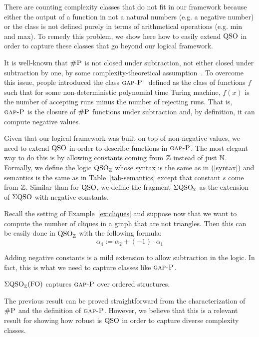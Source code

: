 There are counting complexity classes that do not fit in our framework because either the output of a function in not a natural numbers (e.g. a negative number) or the class is not defined purely in terms of arithmetical operations (e.g. min and max).
To remedy this problem, we show here how to easily extend ${\rm QSO}$ in order to capture these classes that go beyond our logical framework. 

It is well-known that $\text{\sc \#P}$ is not closed under subtraction, not either closed under subtraction by one, by some complexity-theoretical assumption~\cite{OH93}.
To overcome this issue, people introduced the class $\text{\sc gap-P}$~\cite{fenner1994gap} defined as the class of functions $f$ such that for some non-deterministic polynomial time Turing machine, $f(x)$ is the number of accepting runs minus the number of rejecting runs.
That is, $\text{\sc gap-P}$ is the closure of $\text{\sc \#P}$ functions under subtraction and, by definition, it can compute negative values. 

Given that our logical framework was built on top of non-negative values, we need to extend ${\rm QSO}$ in order to describe functions in $\text{\sc gap-P}$. 
The most elegant way to do this is by allowing constants coming from $\mathbb{Z}$ instead of just $\mathbb{N}$. 
Formally, we define the logic ${\rm QSO}_{\mathbb{Z}}$ whose syntax is the same as in (\ref{syntax}) and semantics is the same as in Table~\ref{tab-semantics} except that constant $s$ come from $\mathbb{Z}$.  
Similar than for ${\rm QSO}$, we define the fragment $\Sigma{\rm QSO}_{\mathbb{Z}}$ as the extension of $\Sigma{\rm QSO}$ with negative constants.
\begin{example}
	Recall the setting of Example~\ref{ex:cliques} and suppose now that we want to compute the number of cliques in a graph that are not triangles. Then this can be easily done in ${\rm QSO}_{\mathbb{Z}}$ with the following formula:
	\[
	\alpha_4 := \alpha_2 + (-1) \cdot \alpha_1 
	\]
\end{example}
Adding negative constants is a mild extension to allow subtraction in the logic. 
In fact, this is what we need to capture classes like $\text{\sc gap-P}$.
\begin{proposition} \label{prop:capture-gapp}
	$\Sigma{\rm QSO}_{\mathbb{Z}}({\rm FO})$ captures $\text{\sc gap-P}$ over ordered structures.
\end{proposition}
The previous result can be proved straightforward from the characterization of $\text{\sc \#P}$ and the definition of $\text{\sc gap-P}$. 
However, we believe that this is a relevant result for showing how robust is ${\rm QSO}$ in order to capture diverse complexity classes.

